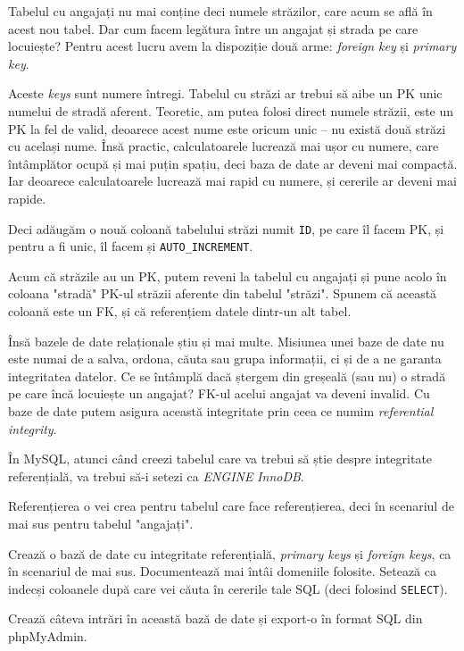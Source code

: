 Tabelul cu angajați nu mai conține deci numele străzilor, care acum se află
în acest nou tabel. Dar cum facem legătura între un angajat și strada pe care
locuiește? Pentru acest lucru avem la dispoziție două arme: \textsl{foreign key}
și \textsl{primary key}.

Aceste \textit{keys} sunt numere întregi. Tabelul cu străzi ar trebui să aibe
un PK unic numelui de stradă aferent. Teoretic, am putea folosi direct
numele străzii, este un PK la fel de valid, deoarece acest nume este oricum unic --
nu există două străzi cu același nume. Însă practic, calculatoarele lucrează
mai ușor cu numere, care întâmplător ocupă și mai puțin spațiu, deci baza de date
ar deveni mai compactă. Iar deoarece calculatoarele lucrează mai rapid cu numere,
și cererile ar deveni mai rapide.

Deci adăugăm o nouă coloană tabelului străzi numit \texttt{ID}, pe care îl facem
PK, și pentru a fi unic, îl facem și \texttt{AUTO\_INCREMENT}.

Acum că străzile au un PK, putem reveni la tabelul cu angajați și pune acolo
în coloana "stradă" PK-ul străzii aferente din tabelul "străzi". Spunem că
această coloană este un FK, și că referențiem datele dintr-un alt tabel.

Însă bazele de date relaționale știu și mai multe. Misiunea unei baze de date
nu este numai de a salva, ordona, căuta sau grupa informații, ci și de a ne
garanta integritatea datelor. Ce se întâmplă dacă ștergem din greșeală (sau nu)
o stradă pe care încă locuiește un angajat? FK-ul acelui angajat va deveni
invalid. Cu baze de date putem asigura această integritate prin ceea ce numim
\textsl{referential integrity}.

În MySQL, atunci când creezi tabelul care va trebui să știe despre integritate
referențială, va trebui să-i setezi ca \textsl{ENGINE} \textsl{InnoDB}.

Referențierea o vei crea pentru tabelul care face referențierea, deci în scenariul
de mai sus pentru tabelul "angajați".

\begin{Exercise}[title={Referential Integrity}]
Crează o bază de date cu integritate referențială, \textit{primary keys} și
\textit{foreign keys}, ca în scenariul de mai sus. Documentează mai întâi domeniile
folosite. Setează ca indecși coloanele după care vei căuta în cererile tale
SQL (deci folosind \texttt{SELECT}).

Crează câteva intrări în această bază de date și export-o în format SQL din phpMyAdmin.
\end{Exercise}


